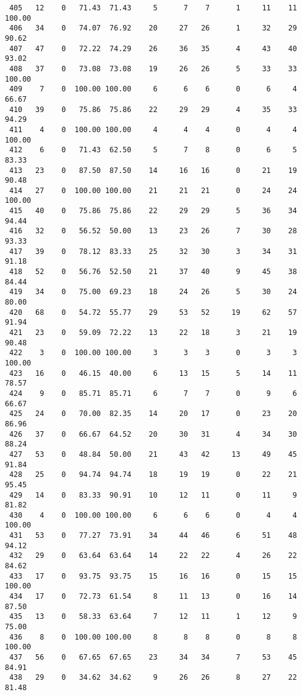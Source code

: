 \begin{verbatim}
 405   12    0   71.43  71.43     5      7    7      1     11    11   100.00
 406   34    0   74.07  76.92    20     27   26      1     32    29    90.62
 407   47    0   72.22  74.29    26     36   35      4     43    40    93.02
 408   37    0   73.08  73.08    19     26   26      5     33    33   100.00
 409    7    0  100.00 100.00     6      6    6      0      6     4    66.67
 410   39    0   75.86  75.86    22     29   29      4     35    33    94.29
 411    4    0  100.00 100.00     4      4    4      0      4     4   100.00
 412    6    0   71.43  62.50     5      7    8      0      6     5    83.33
 413   23    0   87.50  87.50    14     16   16      0     21    19    90.48
 414   27    0  100.00 100.00    21     21   21      0     24    24   100.00
 415   40    0   75.86  75.86    22     29   29      5     36    34    94.44
 416   32    0   56.52  50.00    13     23   26      7     30    28    93.33
 417   39    0   78.12  83.33    25     32   30      3     34    31    91.18
 418   52    0   56.76  52.50    21     37   40      9     45    38    84.44
 419   34    0   75.00  69.23    18     24   26      5     30    24    80.00
 420   68    0   54.72  55.77    29     53   52     19     62    57    91.94
 421   23    0   59.09  72.22    13     22   18      3     21    19    90.48
 422    3    0  100.00 100.00     3      3    3      0      3     3   100.00
 423   16    0   46.15  40.00     6     13   15      5     14    11    78.57
 424    9    0   85.71  85.71     6      7    7      0      9     6    66.67
 425   24    0   70.00  82.35    14     20   17      0     23    20    86.96
 426   37    0   66.67  64.52    20     30   31      4     34    30    88.24
 427   53    0   48.84  50.00    21     43   42     13     49    45    91.84
 428   25    0   94.74  94.74    18     19   19      0     22    21    95.45
 429   14    0   83.33  90.91    10     12   11      0     11     9    81.82
 430    4    0  100.00 100.00     6      6    6      0      4     4   100.00
 431   53    0   77.27  73.91    34     44   46      6     51    48    94.12
 432   29    0   63.64  63.64    14     22   22      4     26    22    84.62
 433   17    0   93.75  93.75    15     16   16      0     15    15   100.00
 434   17    0   72.73  61.54     8     11   13      0     16    14    87.50
 435   13    0   58.33  63.64     7     12   11      1     12     9    75.00
 436    8    0  100.00 100.00     8      8    8      0      8     8   100.00
 437   56    0   67.65  67.65    23     34   34      7     53    45    84.91
 438   29    0   34.62  34.62     9     26   26      8     27    22    81.48

\end{verbatim}
